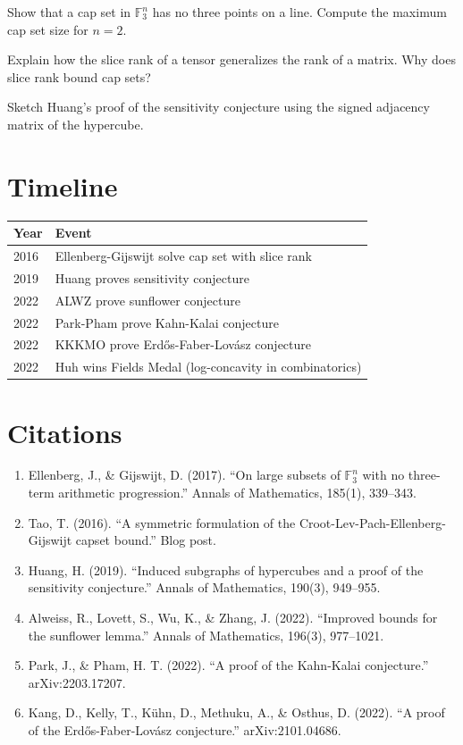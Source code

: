 \begin{exercise}[Basic]
Show that a cap set in $\mathbb{F}_3^n$ has no three points on a line. Compute the maximum cap set size for $n=2$.
\end{exercise}

\begin{exercise}[Intermediate]
Explain how the slice rank of a tensor generalizes the rank of a matrix. Why does slice rank bound cap sets?
\end{exercise}

\begin{exercise}[Challenge]
Sketch Huang's proof of the sensitivity conjecture using the signed adjacency matrix of the hypercube.
\end{exercise}

\section{Timeline}

\begin{tabularx}{\linewidth}{lX}
\toprule
\textbf{Year} & \textbf{Event} \\ \midrule
2016 & Ellenberg-Gijswijt solve cap set with slice rank \\ 
2019 & Huang proves sensitivity conjecture \\ 
2022 & ALWZ prove sunflower conjecture \\ 
2022 & Park-Pham prove Kahn-Kalai conjecture \\ 
2022 & KKKMO prove Erdős-Faber-Lovász conjecture \\ 
2022 & Huh wins Fields Medal (log-concavity in combinatorics) \\
\bottomrule
\end{tabularx}

\section{Citations}

\begin{enumerate}
\item Ellenberg, J., \& Gijswijt, D. (2017). ``On large subsets of $\mathbb{F}_3^n$ with no three-term arithmetic progression.'' Annals of Mathematics, 185(1), 339--343.
\item Tao, T. (2016). ``A symmetric formulation of the Croot-Lev-Pach-Ellenberg-Gijswijt capset bound.'' Blog post.
\item Huang, H. (2019). ``Induced subgraphs of hypercubes and a proof of the sensitivity conjecture.'' Annals of Mathematics, 190(3), 949--955.
\item Alweiss, R., Lovett, S., Wu, K., \& Zhang, J. (2022). ``Improved bounds for the sunflower lemma.'' Annals of Mathematics, 196(3), 977--1021.
\item Park, J., \& Pham, H. T. (2022). ``A proof of the Kahn-Kalai conjecture.'' arXiv:2203.17207.
\item Kang, D., Kelly, T., Kühn, D., Methuku, A., \& Osthus, D. (2022). ``A proof of the Erdős-Faber-Lovász conjecture.'' arXiv:2101.04686.
\end{enumerate}
